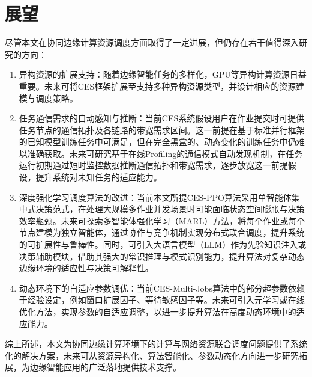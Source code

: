 \section*{展望}
尽管本文在协同边缘计算资源调度方面取得了一定进展，但仍存在若干值得深入研究的方向：
\begin{enumerate}[topsep = 0 pt, itemsep= 0 pt, parsep=0pt, partopsep=0pt, leftmargin=0pt, itemindent=48pt, labelsep=0pt, listparindent=24pt, label=（\arabic*）]
    \item 异构资源的扩展支持：随着边缘智能任务的多样化，GPU等异构计算资源日益重要。未来可将CES框架扩展至支持多种异构资源类型，并设计相应的资源建模与调度策略。
    
    \item 任务通信需求的自动感知与推断：当前CES系统假设用户在作业提交时可提供任务节点的通信拓扑及各链路的带宽需求区间。这一前提在基于标准并行框架的已知模型训练任务中可满足，但在完全黑盒的、动态变化的训练任务中仍难以准确获取。未来可研究基于在线Profiling的通信模式自动发现机制，在任务运行初期通过短时监控数据推断通信拓扑和带宽需求，逐步放宽这一前提假设，提升系统对未知任务的适应能力。

    \item 深度强化学习调度算法的改进：当前本文所提CES-PPO算法采用单智能体集中式决策范式，在处理大规模多作业并发场景时可能面临状态空间膨胀与决策效率瓶颈。未来可探索多智能体强化学习（MARL）方法，将每个作业或每个节点建模为独立智能体，通过协作与竞争机制实现分布式联合调度，提升系统的可扩展性与鲁棒性。同时，可引入大语言模型（LLM）作为先验知识注入或决策辅助模块，借助其强大的常识推理与模式识别能力，提升算法对复杂动态边缘环境的适应性与决策可解释性。
    
    \item 动态环境下的自适应参数调优：当前CES-Multi-Jobs算法中的部分超参数依赖于经验设定，例如窗口扩展因子、等待敏感因子等。未来可引入元学习或在线优化方法，实现参数的自适应调整，以进一步提升算法在高度动态环境中的适应能力。
\end{enumerate}

综上所述，本文为协同边缘计算环境下的计算与网络资源联合调度问题提供了系统化的解决方案，未来可从资源异构化、算法智能化、参数动态化方向进一步研究拓展，为边缘智能应用的广泛落地提供技术支撑。